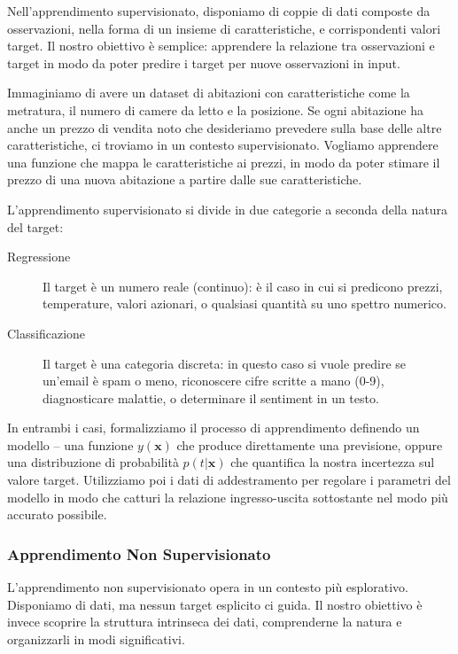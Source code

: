 Nell'apprendimento supervisionato, disponiamo di coppie di dati composte da osservazioni, nella forma di un insieme di caratteristiche, e corrispondenti valori target. Il nostro obiettivo è semplice: apprendere la relazione tra osservazioni e target in modo da poter predire i target per nuove osservazioni in input.

Immaginiamo di avere un dataset di abitazioni con caratteristiche come la metratura, il numero di camere da letto e la posizione. Se ogni abitazione ha anche un prezzo di vendita noto che desideriamo prevedere sulla base delle altre caratteristiche, ci troviamo in un contesto supervisionato. Vogliamo apprendere una funzione che mappa le caratteristiche ai prezzi, in modo da poter stimare il prezzo di una nuova abitazione a partire dalle sue caratteristiche.

L'apprendimento supervisionato si divide in due categorie a seconda della natura del target:

\begin{description}
\item[Regressione] Il target è un numero reale (continuo): è il caso in cui si predicono prezzi, temperature, valori azionari, o qualsiasi quantità su uno spettro numerico.

\item[Classificazione] Il target è una categoria discreta: in questo caso si vuole predire se un'email è spam o meno, riconoscere cifre scritte a mano (0-9), diagnosticare malattie, o determinare il sentiment in un testo.
\end{description}

In entrambi i casi, formalizziamo il processo di apprendimento definendo un modello -- una funzione $y(\mathbf{x})$ che produce direttamente una previsione, oppure una distribuzione di probabilità $p(t|\mathbf{x})$ che quantifica la nostra incertezza sul valore target. Utilizziamo poi i dati di addestramento per regolare i parametri del modello in modo che catturi la relazione ingresso-uscita sottostante nel modo più accurato possibile.


\subsubsection*{Apprendimento Non Supervisionato}

L'apprendimento non supervisionato opera in un contesto più esplorativo. Disponiamo di dati, ma nessun target esplicito ci guida. Il nostro obiettivo è invece scoprire la struttura intrinseca dei dati, comprenderne la natura e organizzarli in modi significativi.

